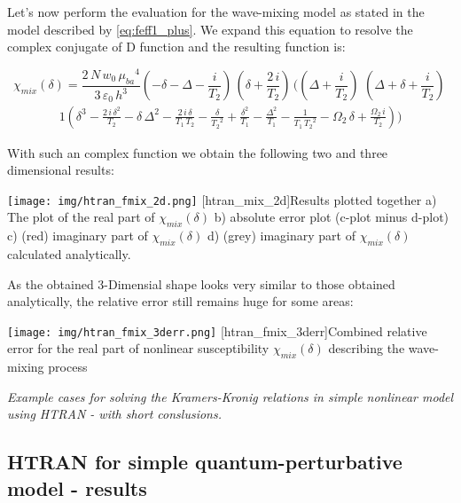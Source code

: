 \documentclass[12pt,twoside,a4paper]{article}
\numberwithin{equation}{subsection}
\numberwithin{figure}{subsection}
\begin{document}
Let's now perform the evaluation for the wave-mixing model as stated in the model described by \ref{eq:feff1_plus}. We expand this
equation to resolve the complex conjugate of D function and the resulting function is:

\begin{equation} \label{eq:htran_feffexp}
  {\chi_{mix}}(\delta ) = 
    \frac{2\,N\,{w_{0}}\,{\mu_{ba}}^{4}}{3\,\varepsilon_0\,h^{3}}( - \delta - \Delta - \frac {i}{{T_{2}}})\,(\delta +
    \frac{2\,i}{{T_{2}}})\,((\Delta + \frac {i}{{T_{2}}})\,\,(\Delta + \delta + \frac {i}{{T_{2}}})\,
\end{equation}
\begin{alignat*}{1}
  (\delta ^{3} - \frac
    {2\,i\,\delta ^{2}}{{T _{2}}} - \delta \,\Delta ^{2} - \frac {2\,i\,\delta }{{T_{1}}\,{T_{2}}} - \frac {\delta }{{T_{2}}^{2}} +
    \frac {\delta ^{2}}{{T_{1 }}} - \frac {\Delta ^{2}}{{T_{1}}} - \frac {1}{{T_{1}}\,{T_{2}}^{2}} - {\Omega_{2}}\,\delta  + \frac
    {{\Omega_{2}}\,i}{{T_{2}}}) )
\end{alignat*}

With such an complex function we obtain the following two and three dimensional results:
\begin{center}
  \texttt{[image: img/htran\_fmix\_2d.png]}
  [htran_mix_2d]{Results plotted together
   a) The plot of the real part of ${\chi_{mix}}(\delta )$
   b) absolute error plot (c-plot minus d-plot)
   c) (red) imaginary part of  ${\chi_{mix}}(\delta )$
   d) (grey) imaginary part of ${\chi_{mix}}(\delta )$ calculated analytically.
   \label{fig:htran_mix_2d} 
   }
\end{center}

As the obtained 3-Dimensial shape looks very similar to those obtained analytically, the relative error still remains huge for some
areas:

\begin{center}
  \texttt{[image: img/htran\_fmix\_3derr.png]}
  [htran_fmix_3derr]{Combined relative error for the real part of nonlinear susceptibility ${\chi_{mix}}(\delta
  )$ describing the wave-mixing process}
  \label{htran_fmix_3derr}
\end{center}

\textit{Example cases for solving the Kramers-Kronig relations in simple nonlinear model using HTRAN - with short conslusions.}

\subsection{HTRAN for simple quantum-perturbative model - results} \label{chap:htran_quantum}
\end{document}
